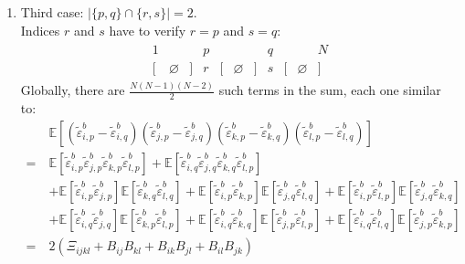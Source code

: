 \documentclass[12pt]{scrartcl}
\begin{document}
\begin{enumerate}
\item Third case: $|\{p,q\} \cap \{r,s\}| = 2$.\\
Indices $r$ and $s$ have to verify $r = p$ and $s = q$:
\begin{align}
\begin{array}{ccccccccccc}
1 & & & p & & & & q & & & N \\
\big[ & \varnothing & \big] & r & \big[ & \varnothing & \big] & s & \big[ & \varnothing & \big] \nonumber
\end{array}
\end{align}
Globally, there are $\displaystyle \frac{N(N-1)(N-2)}{2}$ such terms in the sum, each one similar to:
\begin{align}
& \mathbb{E}\left[ \left(\widetilde{\varepsilon}^b_{i,p}-\widetilde{\varepsilon}^b_{i,q}\right)\left(\widetilde{\varepsilon}^b_{j,p}-\widetilde{\varepsilon}^b_{j,q}\right) \left(\widetilde{\varepsilon}^b_{k,p}-\widetilde{\varepsilon}^b_{k,q}\right)\left(\widetilde{\varepsilon}^b_{l,p}-\widetilde{\varepsilon}^b_{l,q}\right) \right] \nonumber \\
= \ & \mathbb{E} \left[\widetilde{\varepsilon}^b_{i,p} \widetilde{\varepsilon}^b_{j,p} \widetilde{\varepsilon}^b_{k,p} \widetilde{\varepsilon}^b_{l,p}\right] + \mathbb{E} \left[\widetilde{\varepsilon}^b_{i,q} \widetilde{\varepsilon}^b_{j,q} \widetilde{\varepsilon}^b_{k,q} \widetilde{\varepsilon}^b_{l,p}\right] \nonumber \\
& + \mathbb{E}\left[\widetilde{\varepsilon}^b_{i,p} \widetilde{\varepsilon}^b_{j,p}\right] \mathbb{E}\left[\widetilde{\varepsilon}^b_{k,q} \widetilde{\varepsilon}^b_{l,q}\right] + \mathbb{E}\left[\widetilde{\varepsilon}^b_{i,p} \widetilde{\varepsilon}^b_{k,p}\right] \mathbb{E}\left[\widetilde{\varepsilon}^b_{j,q} \widetilde{\varepsilon}^b_{l,q}\right] + \mathbb{E}\left[\widetilde{\varepsilon}^b_{i,p} \widetilde{\varepsilon}^b_{l,p}\right] \mathbb{E}\left[\widetilde{\varepsilon}^b_{j,q} \widetilde{\varepsilon}^b_{k,q}\right] \nonumber \\
& + \mathbb{E}\left[\widetilde{\varepsilon}^b_{i,q} \widetilde{\varepsilon}^b_{j,q}\right] \mathbb{E}\left[\widetilde{\varepsilon}^b_{k,p} \widetilde{\varepsilon}^b_{l,p}\right] + \mathbb{E}\left[\widetilde{\varepsilon}^b_{i,q} \widetilde{\varepsilon}^b_{k,q}\right] \mathbb{E}\left[\widetilde{\varepsilon}^b_{j,p} \widetilde{\varepsilon}^b_{l,p}\right] + \mathbb{E}\left[\widetilde{\varepsilon}^b_{i,q} \widetilde{\varepsilon}^b_{l,q}\right] \mathbb{E}\left[\widetilde{\varepsilon}^b_{j,p} \widetilde{\varepsilon}^b_{k,p}\right] \nonumber \\
= \ & 2 \left(\Xi_{ijkl} + B_{ij} B_{kl} + B_{ik} B_{jl} + B_{il} B_{jk}\right)
\end{align}
\end{enumerate}
\end{document}
